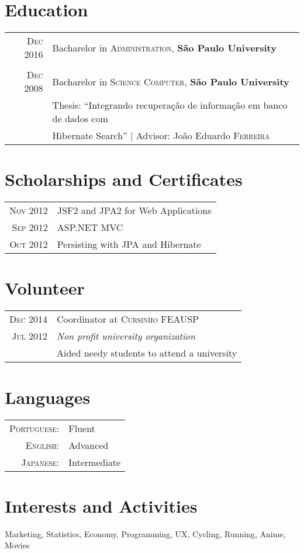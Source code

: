 \documentclass[a4paper,10pt]{article}
\begin{document}
\section{Education}
\begin{tabular}{rl} 
 \textsc{Dec} 2016 & Bacharelor in \textsc{Administration}, \textbf{São Paulo University}\\
&\\
\textsc{Dec} 2008& Bacharelor in \textsc{Science Computer}, \textbf{São Paulo University}\\
& Thesis: ``Integrando recuperação de informação em banco de dados com \\
& Hibernate Search'' | \small Advisor: João Eduardo \textsc{Ferreira}\\
\end{tabular}

\section{Scholarships and Certificates}
\begin{tabular}{rl}
 \textsc{Nov} 2012 & JSF2 and JPA2 for Web Applications\\
\textsc{Sep} 2012 & ASP.NET MVC\\
\textsc{Oct} 2012 & Persisting with JPA and Hibernate\\
\end{tabular}

\section{Volunteer}
\begin{tabular}{r|p{11cm}}
  \textsc{Dec} 2014 & Coordinator at \textsc{Cursinho FEAUSP} \\\textsc{Jul 2012}&\emph{Non profit university organization}\\&\footnotesize{
 Aided needy students to attend a university}

\end{tabular}

\section{Languages}
\begin{tabular}{rl}
 \textsc{Portuguese:}&Fluent\\
\textsc{English:}&Advanced\\
\textsc{Japanese:}&Intermediate\\
\end{tabular}

\section{Interests and Activities}
Marketing, Statistics, Economy, Programming, UX, Cycling, Running, Anime, Movies\\

\newpage

\end{document}
